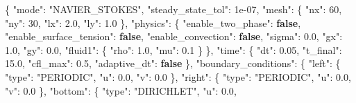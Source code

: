 \documentclass[
  10pt,
]{article}
\newenvironment{Shaded}{}{}
\newcommand{\DataTypeTok}[1]{\textcolor[rgb]{0.56,0.13,0.00}{#1}}
\newcommand{\DecValTok}[1]{\textcolor[rgb]{0.25,0.63,0.44}{#1}}
\newcommand{\FloatTok}[1]{\textcolor[rgb]{0.25,0.63,0.44}{#1}}
\newcommand{\FunctionTok}[1]{\textcolor[rgb]{0.02,0.16,0.49}{#1}}
\newcommand{\KeywordTok}[1]{\textcolor[rgb]{0.00,0.44,0.13}{\textbf{#1}}}
\newcommand{\StringTok}[1]{\textcolor[rgb]{0.25,0.44,0.63}{#1}}
\begin{document}
\begin{Shaded}
\begin{Highlighting}[]
\FunctionTok{\{}
  \DataTypeTok{"mode"}\FunctionTok{:} \StringTok{"NAVIER\_STOKES"}\FunctionTok{,}
  \DataTypeTok{"steady\_state\_tol"}\FunctionTok{:} \DecValTok{1e{-}07}\FunctionTok{,}
  \DataTypeTok{"mesh"}\FunctionTok{:} \FunctionTok{\{}
    \DataTypeTok{"nx"}\FunctionTok{:} \DecValTok{60}\FunctionTok{,}
    \DataTypeTok{"ny"}\FunctionTok{:} \DecValTok{30}\FunctionTok{,}
    \DataTypeTok{"lx"}\FunctionTok{:} \FloatTok{2.0}\FunctionTok{,}
    \DataTypeTok{"ly"}\FunctionTok{:} \FloatTok{1.0}
  \FunctionTok{\},}
  \DataTypeTok{"physics"}\FunctionTok{:} \FunctionTok{\{}
    \DataTypeTok{"enable\_two\_phase"}\FunctionTok{:} \KeywordTok{false}\FunctionTok{,}
    \DataTypeTok{"enable\_surface\_tension"}\FunctionTok{:} \KeywordTok{false}\FunctionTok{,}
    \DataTypeTok{"enable\_convection"}\FunctionTok{:} \KeywordTok{false}\FunctionTok{,}
    \DataTypeTok{"sigma"}\FunctionTok{:} \FloatTok{0.0}\FunctionTok{,}
    \DataTypeTok{"gx"}\FunctionTok{:} \FloatTok{1.0}\FunctionTok{,}
    \DataTypeTok{"gy"}\FunctionTok{:} \FloatTok{0.0}\FunctionTok{,}
    \DataTypeTok{"fluid1"}\FunctionTok{:} \FunctionTok{\{}
      \DataTypeTok{"rho"}\FunctionTok{:} \FloatTok{1.0}\FunctionTok{,}
      \DataTypeTok{"mu"}\FunctionTok{:} \FloatTok{0.1}
    \FunctionTok{\}}
  \FunctionTok{\},}
  \DataTypeTok{"time"}\FunctionTok{:} \FunctionTok{\{}
    \DataTypeTok{"dt"}\FunctionTok{:} \FloatTok{0.05}\FunctionTok{,}
    \DataTypeTok{"t\_final"}\FunctionTok{:} \FloatTok{15.0}\FunctionTok{,}
    \DataTypeTok{"cfl\_max"}\FunctionTok{:} \FloatTok{0.5}\FunctionTok{,}
    \DataTypeTok{"adaptive\_dt"}\FunctionTok{:} \KeywordTok{false}
  \FunctionTok{\},}
  \DataTypeTok{"boundary\_conditions"}\FunctionTok{:} \FunctionTok{\{}
    \DataTypeTok{"left"}\FunctionTok{:} \FunctionTok{\{}
      \DataTypeTok{"type"}\FunctionTok{:} \StringTok{"PERIODIC"}\FunctionTok{,}
      \DataTypeTok{"u"}\FunctionTok{:} \FloatTok{0.0}\FunctionTok{,}
      \DataTypeTok{"v"}\FunctionTok{:} \FloatTok{0.0}
    \FunctionTok{\},}
    \DataTypeTok{"right"}\FunctionTok{:} \FunctionTok{\{}
      \DataTypeTok{"type"}\FunctionTok{:} \StringTok{"PERIODIC"}\FunctionTok{,}
      \DataTypeTok{"u"}\FunctionTok{:} \FloatTok{0.0}\FunctionTok{,}
      \DataTypeTok{"v"}\FunctionTok{:} \FloatTok{0.0}
    \FunctionTok{\},}
    \DataTypeTok{"bottom"}\FunctionTok{:} \FunctionTok{\{}
      \DataTypeTok{"type"}\FunctionTok{:} \StringTok{"DIRICHLET"}\FunctionTok{,}
      \DataTypeTok{"u"}\FunctionTok{:} \FloatTok{0.0}\FunctionTok{,}

\end{Highlighting}
\end{Shaded}
\end{document}
